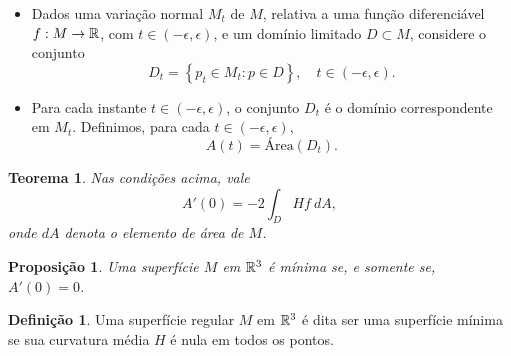 \documentclass[12pt,a4paper]{beamer}
\newtheorem{teorema}{Teorema}
\newtheorem{proposicao}{Proposição}
\theoremstyle{definition}
\newtheorem{definicao}{Definição}
\begin{document}
\begin{frame}
	
	\begin{itemize}
		\item Dados uma variação normal $M_t$ de $M$, relativa a uma função diferenciável $f: M \rightarrow \mathbb R$, com $t \in (-\epsilon,\epsilon)$, e um domínio limitado $D \subset M$, considere o conjunto
		\begin{equation*}
		D_t = \left\{ p_t \in M_t: p \in D \right\}, \quad t \in (-\epsilon,\epsilon).
		\end{equation*}
		
		\pause
		
		\item Para cada instante $t \in (-\epsilon,\epsilon)$, o conjunto $D_t$ é o domínio correspondente em $M_t$. Definimos, para cada $t \in (-\epsilon,\epsilon)$,
		\begin{equation*}
		A(t) = \text{Área} (D_t).
		\end{equation*}
	\end{itemize}

	 
	
	
	
	
\end{frame}

\begin{frame}

	\begin{teorema}
		Nas condições acima, vale
		\begin{equation}\label{primeira-variacao-da-area}
		A'(0) = -2 \int_D H f\ dA,
		\end{equation}
		onde $dA$ denota o elemento de área de $M$.
	\end{teorema}

	\pause

	\begin{proposicao}
		\label{superficie-minima-como-ponto-critico-do-funcional-da-area}
		Uma superfície $M$ em $\mathbb R^3$ é \alert{mínima} se, e somente se, $A'(0)=0$.
	\end{proposicao}

	\pause
	
	\begin{definicao}
		Uma superfície regular $M$ em $\mathbb R^3$ é dita ser uma  \alert{superfície mínima} se sua curvatura
		média $H$ é nula em todos os pontos.
	\end{definicao}

	
\end{frame}
\end{document}
